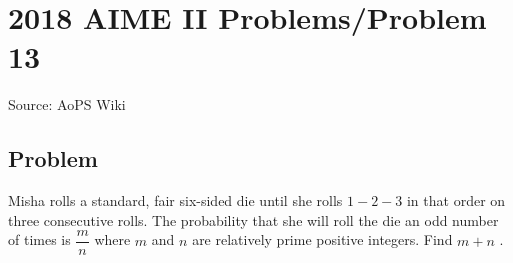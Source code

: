 \documentclass[12pt]{article}
\begin{document}
\section*{{2018 AIME II Problems/Problem 13}}
Source: AoPS Wiki

\subsection*{Problem}
Misha rolls a standard, fair six-sided die until she rolls $1-2-3$ in that order on three consecutive rolls. The probability that she will roll the die an odd number of times is $\dfrac{m}{n}$ where $m$ and $n$ are relatively prime positive integers. Find $m+n$ .
\end{document}
